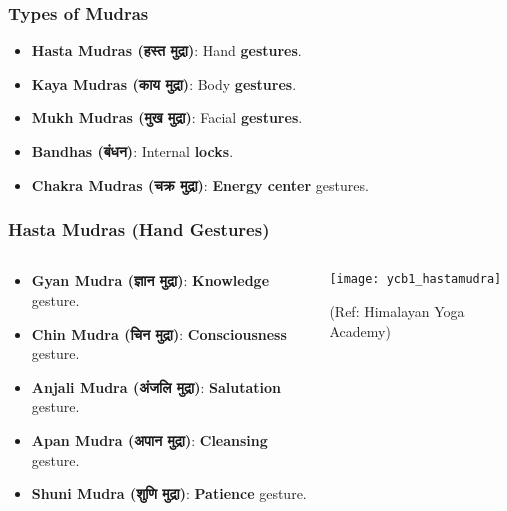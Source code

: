 \begin{frame}[fragile]\frametitle{Types of Mudras}

      \begin{itemize}
        \item \textbf{Hasta Mudras (हस्त मुद्रा)}: Hand \textbf{gestures}.
        \item \textbf{Kaya Mudras (काय मुद्रा)}: Body \textbf{gestures}.
        \item \textbf{Mukh Mudras (मुख मुद्रा)}: Facial \textbf{gestures}.
        \item \textbf{Bandhas (बंधन)}: Internal \textbf{locks}.
        \item \textbf{Chakra Mudras (चक्र मुद्रा)}: \textbf{Energy center} gestures.
      \end{itemize}

\end{frame}


\begin{frame}[fragile]\frametitle{Hasta Mudras (Hand Gestures)}
\begin{columns}
    \begin{column}[T]{0.5\linewidth}
      \begin{itemize}
        \item \textbf{Gyan Mudra (ज्ञान मुद्रा)}: \textbf{Knowledge} gesture.
        \item \textbf{Chin Mudra (चिन मुद्रा)}: \textbf{Consciousness} gesture.
        \item \textbf{Anjali Mudra (अंजलि मुद्रा)}: \textbf{Salutation} gesture.
        \item \textbf{Apan Mudra (अपान मुद्रा)}: \textbf{Cleansing} gesture.
        \item \textbf{Shuni Mudra (शुणि मुद्रा)}: \textbf{Patience} gesture.
      \end{itemize}
    \end{column}
    \begin{column}[T]{0.5\linewidth}
        \begin{center}
        \texttt{[image: ycb1\_hastamudra]}
				
		{\tiny (Ref: Himalayan Yoga Academy)}	 
        \end{center}	
    \end{column}
\end{columns}
\end{frame}



